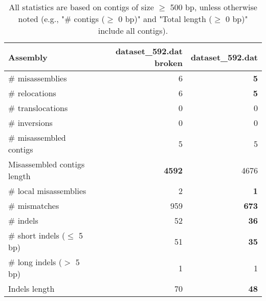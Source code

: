 \documentclass[12pt,a4paper]{article}
\begin{document}
\begin{table}[ht]
\begin{center}
\caption{All statistics are based on contigs of size $\geq$ 500 bp, unless otherwise noted (e.g., "\# contigs ($\geq$ 0 bp)" and "Total length ($\geq$ 0 bp)" include all contigs).}
\begin{tabular}{|l*{2}{|r}|}
\hline
Assembly & dataset\_592.dat broken & dataset\_592.dat \\ \hline
\# misassemblies & 6 & {\bf 5} \\ \hline
\hspace{5mm}\# relocations & 6 & {\bf 5} \\ \hline
\hspace{5mm}\# translocations & 0 & 0 \\ \hline
\hspace{5mm}\# inversions & 0 & 0 \\ \hline
\# misassembled contigs & 5 & 5 \\ \hline
Misassembled contigs length & {\bf 4592} & 4676 \\ \hline
\# local misassemblies & 2 & {\bf 1} \\ \hline
\# mismatches & 959 & {\bf 673} \\ \hline
\# indels & 52 & {\bf 36} \\ \hline
\hspace{5mm}\# short indels ($\leq$ 5 bp) & 51 & {\bf 35} \\ \hline
\hspace{5mm}\# long indels ($>$ 5 bp) & 1 & 1 \\ \hline
Indels length & 70 & {\bf 48} \\ \hline
\end{tabular}
\end{center}
\end{table}
\end{document}
